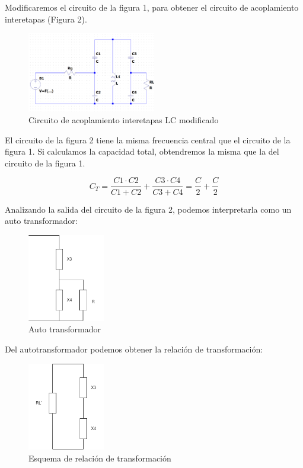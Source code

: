 Modificaremos el circuito de la figura 1, para obtener el circuito de acoplamiento interetapas (Figura 2). 

\begin{figure}[h]
    \centering
    \includegraphics[width=0.5\textwidth]{Imagenes/circuito_acoplamiento2.png}
    \caption{Circuito de acoplamiento interetapas LC modificado}
\end{figure}

El circuito de la figura 2 tiene la misma frecuencia central que el circuito de la figura 1. Si calculamos la capacidad total, obtendremos la misma que la del circuito de la figura 1.

\begin{equation}
    C_T = \frac{C1 \cdot C2}{C1 + C2} + \frac{C3 \cdot C4}{C3 + C4} = \frac{C}{2} + \frac{C}{2} 
\end{equation}

Analizando la salida del circuito de la figura 2, podemos interpretarla como un auto transformador:

\begin{figure}[h]
    \centering
    \includegraphics[width=0.3\textwidth]{Imagenes/Esquema_autotrafo.png}
    \caption{Auto transformador}
\end{figure}


Del autotransformador podemos obtener la relación de transformación:

\begin{figure}[h]
    \centering
    \includegraphics[width=0.3\textwidth]{Imagenes/relacion_transformacion.png}
    \caption{Esquema de relación de transformación}
\end{figure}

